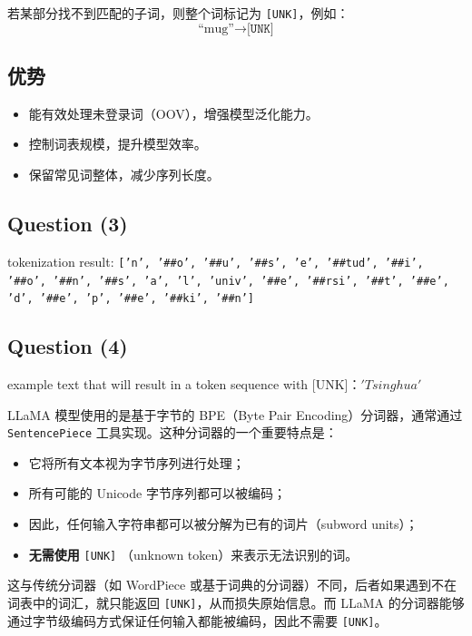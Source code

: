 \documentclass[12pt,letterpaper]{article}
\begin{document}
若某部分找不到匹配的子词，则整个词标记为 \texttt{[UNK]}，例如：
\[
\text{``mug''} \rightarrow \texttt{[UNK]}
\]


\subsection*{优势}

\begin{itemize}
	\item 能有效处理未登录词（OOV），增强模型泛化能力。
	\item 控制词表规模，提升模型效率。
	\item 保留常见词整体，减少序列长度。
\end{itemize}


\subsection*{Question (3)}

tokenization result:
\texttt{['n', '\#\#o', '\#\#u', '\#\#s', 'e', '\#\#tud', '\#\#i', '\#\#o', '\#\#n', '\#\#s', 'a', 'l', 'univ', '\#\#e', '\#\#rsi', '\#\#t', '\#\#e', 'd', '\#\#e', 'p', '\#\#e', '\#\#ki', '\#\#n']}

\subsection*{Question (4)}

example text that will result in a token sequence with [UNK]：$'Tsinghua'$

\vspace{1em}

LLaMA 模型使用的是基于字节的 BPE（Byte Pair Encoding）分词器，通常通过 \texttt{SentencePiece} 工具实现。这种分词器的一个重要特点是：

\begin{itemize}
	\item 它将所有文本视为字节序列进行处理；
	\item 所有可能的 Unicode 字节序列都可以被编码；
	\item 因此，任何输入字符串都可以被分解为已有的词片（subword units）；
	\item \textbf{无需使用} \texttt{[UNK]} （unknown token）来表示无法识别的词。
\end{itemize}

这与传统分词器（如 WordPiece 或基于词典的分词器）不同，后者如果遇到不在词表中的词汇，就只能返回 \texttt{[UNK]}，从而损失原始信息。而 LLaMA 的分词器能够通过字节级编码方式保证任何输入都能被编码，因此不需要 \texttt{[UNK]}。
\end{document}
